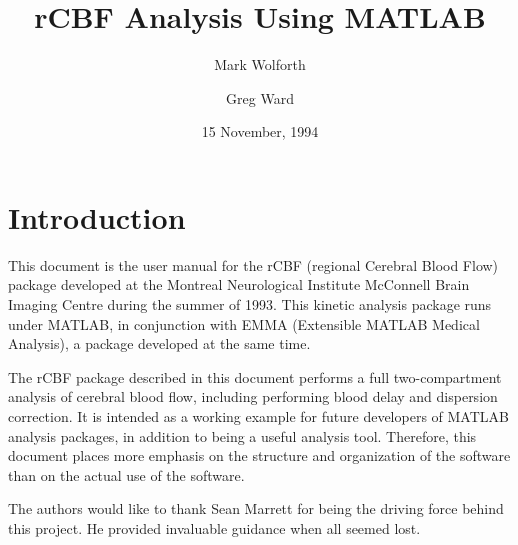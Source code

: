 
\title{rCBF Analysis Using MATLAB}
\author{Mark Wolforth \and Greg Ward}
\date{15 November, 1994}
\def\code#1{{\tt #1}}


\def\ttlabel#1{{\tt #1: }}
\newenvironment{ttdescription}[1]
{\newbox\holder
 \setbox\holder=\hbox{\ttlabel#1}
 \dimen0=\wd\holder
 \begin{list}{}
 {\labelsep=-0.25in
  \rightmargin=0.25in
  \leftmargin=\dimen0
  \addtolength{\leftmargin}{0.25in}
  \labelwidth=\leftmargin
  \let\makelabel\ttlabel}}%
{\end{list}}



\maketitle

\tableofcontents

\newpage
\section{Introduction}

This document is the user manual for the rCBF (regional Cerebral
Blood Flow) package developed at the Montreal Neurological Institute
McConnell Brain Imaging Centre during the summer of 1993.  This
kinetic analysis package runs under MATLAB, in conjunction with EMMA
(Extensible MATLAB Medical Analysis), a package developed at the same
time.

The rCBF package described in this document performs a full
two-compartment analysis of cerebral blood flow, including performing
blood delay and dispersion correction.  It is intended as a working
example for future developers of MATLAB analysis packages, in
addition to being a useful analysis tool.  Therefore, this document
places more emphasis on the structure and organization of the
software than on the actual use of the software.

The authors would like to thank Sean Marrett for being the driving
force behind this project.  He provided invaluable guidance when all
seemed lost.

\newpage
